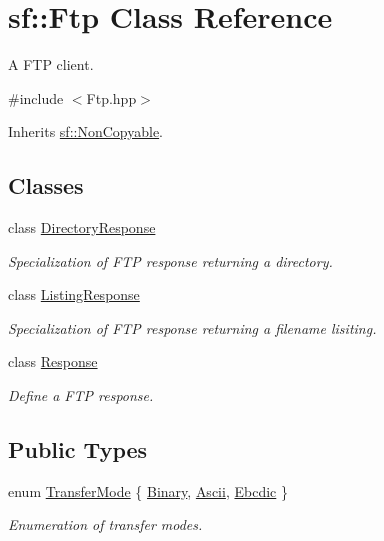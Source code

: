 \hypertarget{classsf_1_1_ftp}{\section{sf\+:\+:Ftp Class Reference}
\label{classsf_1_1_ftp}
}


A F\+T\+P client.  




{\ttfamily \#include $<$Ftp.\+hpp$>$}



Inherits \hyperlink{classsf_1_1_non_copyable}{sf\+::\+Non\+Copyable}.

\subsection*{Classes}
\begin{DoxyCompactItemize}
\item 
class \hyperlink{classsf_1_1_ftp_1_1_directory_response}{Directory\+Response}
\begin{DoxyCompactList}\small\item\em Specialization of F\+T\+P response returning a directory. \end{DoxyCompactList}\item 
class \hyperlink{classsf_1_1_ftp_1_1_listing_response}{Listing\+Response}
\begin{DoxyCompactList}\small\item\em Specialization of F\+T\+P response returning a filename lisiting. \end{DoxyCompactList}\item 
class \hyperlink{classsf_1_1_ftp_1_1_response}{Response}
\begin{DoxyCompactList}\small\item\em Define a F\+T\+P response. \end{DoxyCompactList}\end{DoxyCompactItemize}
\subsection*{Public Types}
\begin{DoxyCompactItemize}
\item 
enum \hyperlink{classsf_1_1_ftp_a1cd6b89ad23253f6d97e6d4ca4d558cb}{Transfer\+Mode} \{ \hyperlink{classsf_1_1_ftp_a1cd6b89ad23253f6d97e6d4ca4d558cba6f253b362639fb5e059dc292762a21ee}{Binary}, 
\hyperlink{classsf_1_1_ftp_a1cd6b89ad23253f6d97e6d4ca4d558cbac9e544a22dce8ef3177449cb235d15c2}{Ascii}, 
\hyperlink{classsf_1_1_ftp_a1cd6b89ad23253f6d97e6d4ca4d558cbabb1e34435231e73c96534c71090be7f4}{Ebcdic}
 \}
\begin{DoxyCompactList}\small\item\em Enumeration of transfer modes. \end{DoxyCompactList}\end{DoxyCompactItemize}
